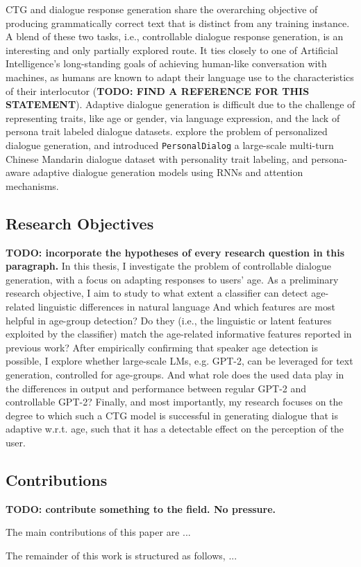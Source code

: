 CTG and dialogue response generation share the overarching objective of producing grammatically correct text that is distinct from any training instance. A blend of these two tasks, i.e., controllable dialogue response generation, is an interesting and only partially explored route. It ties closely to one of Artificial Intelligence's long-standing goals of achieving human-like conversation with machines, as humans are known to adapt their language use to the characteristics of their interlocutor (\textbf{TODO: FIND A REFERENCE FOR THIS STATEMENT}). Adaptive dialogue generation is difficult due to the challenge of representing traits, like age or gender, via language expression, and the lack of persona trait labeled dialogue datasets. \cite{zheng2019personalized} explore the problem of personalized dialogue generation, and introduced \texttt{PersonalDialog} a large-scale multi-turn Chinese Mandarin dialogue dataset with personality trait labeling, and persona-aware adaptive dialogue generation models using RNNs and attention mechanisms. 

\subsection{Research Objectives}
\textbf{TODO: incorporate the hypotheses of every research question in this paragraph.}
In this thesis, I investigate the problem of controllable dialogue generation, with a focus on adapting responses to users' age. As a preliminary research objective, I aim to study to what extent a classifier can detect age-related linguistic differences in natural language And which features are most helpful in age-group detection? Do they (i.e., the linguistic or latent features exploited by the classifier) match the age-related informative features reported in previous work? 
After empirically confirming that speaker age detection is possible, I explore whether large-scale LMs, e.g. GPT-2, can be leveraged for text generation, controlled for age-groups. And what role does the used data play in the differences in output and performance between regular GPT-2 and controllable GPT-2?
Finally, and most importantly, my research focuses on the degree to which such a CTG model is successful in generating dialogue that is adaptive w.r.t. age, such that it has a detectable effect on the perception of the user.

\subsection{Contributions}

\textbf{TODO: contribute something to the field. No pressure.}

The main contributions of this paper are ...

The remainder of this work is structured as follows, ...